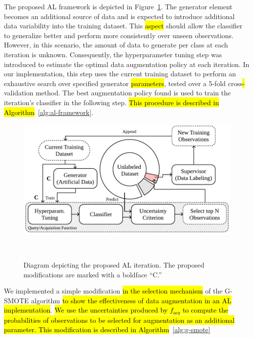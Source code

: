 \documentclass[preprint, 12pt]{elsarticle}
\begin{document}
The proposed\hl{ }AL framework is depicted in Figure~\ref{fig:al_proposed}.
The generator element becomes an additional source of data and is expected to
introduce additional data variability into the training dataset. This
\hl{aspect} should allow the classifier to generalize better and perform more
consistently over unseen observations. However, in this scenario, the amount
of data to generate per class at each iteration is unknown. Consequently, the
hyperparameter tuning step was introduced to estimate the optimal data
augmentation policy at each iteration. In our implementation, this step uses
the current training dataset to perform an exhaustive search over specified
generator \hl{parameters}, tested over a 5-fold cross\hl{-}validation
method. The best augmentation policy found is used to train the iteration's
classifier in the following step. \hl{This procedure is described in
Algorithm}~\ref{alg:al-framework}.


\begin{figure}[H]
	\centering
	\includegraphics[width=.75\linewidth]{../analysis/al_proposed}
    \caption{%
        Diagram depicting the proposed AL iteration. The proposed
        modifications are marked with a boldface ``C.''
    }~\label{fig:al_proposed}
\end{figure}

We implemented a simple modification \hl{in the selection mechanism} of the
G-SMOTE algorithm \hl{to show the effectiveness of data augmentation in an AL
implementation}. \hl{We use the uncertainties produced by $f_{acq}$ to compute
the probabilities of observations to be selected for augmentation as an
additional parameter. This modification is described in
Algorithm}~\ref{alg:g-smote} 
\end{document}
